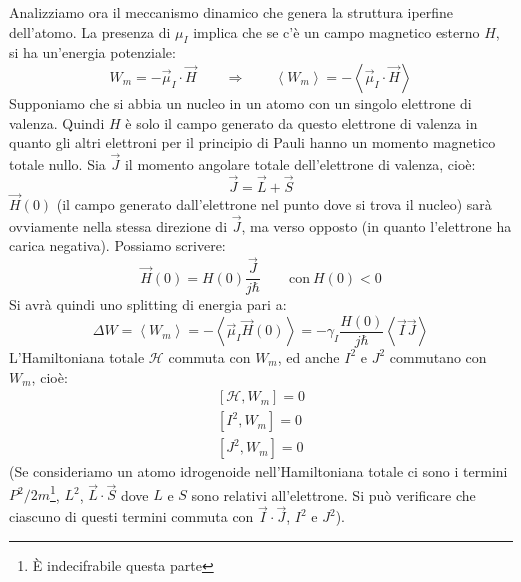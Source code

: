 Analizziamo ora il meccanismo dinamico che genera la struttura iperfine
dell'atomo. La presenza di $\mu_I$ implica che se c'è un campo magnetico esterno
$H$, si ha un'energia potenziale:
\begin{equation}
W_m = -\vec{\mu}_I \cdot \vec{H} \qquad \Rightarrow \qquad \left \langle W_m \right \rangle = -\left \langle \vec{\mu}_I \cdot \vec{H} \right \rangle
\end{equation}
Supponiamo che si abbia un nucleo in un atomo con un singolo elettrone di
valenza. Quindi $H$ è solo il campo generato da questo elettrone di valenza in
quanto gli altri elettroni per il principio di Pauli hanno un momento magnetico
totale nullo. Sia $\vec{J}$ il momento angolare totale dell'elettrone di
valenza, cioè:
\begin{equation}
\vec{J} = \vec{L} + \vec{S}
\end{equation}
 $\vec{H}{(0)}$ (il campo generato dall'elettrone nel punto dove si trova il
 nucleo) sarà ovviamente nella stessa direzione di $\vec{J}$, ma verso opposto
 (in quanto l'elettrone ha carica negativa). Possiamo scrivere:
\begin{equation}
\vec{H}{(0)} = H{(0)}\frac{\vec{J}}{j\hbar} \qquad \text{con}\ H{(0)}<0
\end{equation}
Si avrà quindi uno splitting di energia pari a:
\begin{equation}
\Delta W = \left \langle W_m \right \rangle = -\left \langle \vec{\mu}_I \vec{H}{(0)} \right \rangle = -\gamma_I \frac{H{(0)}}{j \hbar} \left \langle \vec{I} \vec{J} \right \rangle
\end{equation}
L'Hamiltoniana totale $\mathcal{H}$ commuta con $W_m$, ed anche $I^2$ e $J^2$
commutano con $W_m$, cioè:
\begin{equation}\begin{split}
\left [ \mathcal{H}, W_m \right ] = 0\\
\left [ I^2, W_m \right ] = 0\\
\left [ J^2, W_m \right ] = 0
\end{split}\end{equation}
(Se consideriamo un atomo idrogenoide nell'Hamiltoniana totale ci sono i termini
$P^{2}/2m$\footnote{È indecifrabile questa parte}, $L^2$, $\vec{L} \cdot \vec{S}$
dove $L$ e $S$ sono relativi all'elettrone. Si può verificare che ciascuno di
questi termini commuta con $\vec{I} \cdot \vec{J}$, $I^2$ e $J^2$).

